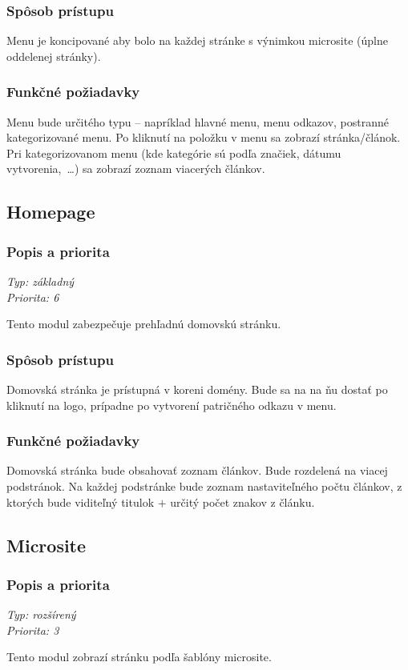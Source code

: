 \documentclass[a4paper,titlepage,11pt]{article}
\begin{document}
\subsubsection{Spôsob prístupu}
Menu je koncipované aby bolo na každej stránke s výnimkou microsite (úplne oddelenej stránky). 
\subsubsection{Funkčné požiadavky}
Menu bude určitého typu -- napríklad hlavné menu, menu odkazov, postranné kategorizované menu. 
Po kliknutí na položku v menu sa zobrazí stránka\slash článok. 
Pri kategorizovanom menu (kde kategórie sú podľa značiek, dátumu vytvorenia,~\ldots) sa zobrazí zoznam viacerých článkov. 

\subsection{Homepage}
\subsubsection{Popis a priorita}
\begin{flushleft}
 \emph{Typ: základný}\\
 \emph{Priorita: 6}\\
\end{flushleft}
Tento modul zabezpečuje prehľadnú domovskú stránku. 
\subsubsection{Spôsob prístupu}
Domovská stránka je prístupná v koreni domény. Bude sa na na ňu dostať po kliknutí na logo, prípadne po vytvorení patričného odkazu v menu.
\subsubsection{Funkčné požiadavky}
Domovská stránka bude obsahovať zoznam článkov. Bude rozdelená na viacej podstránok. 
Na každej podstránke bude zoznam nastaviteľného počtu článkov, z ktorých bude viditeľný titulok $+$ určitý počet znakov z článku.

\subsection{Microsite}
\subsubsection{Popis a priorita}
\begin{flushleft}
 \emph{Typ: rozšírený}\\
 \emph{Priorita: 3}\\
\end{flushleft}
Tento modul zobrazí stránku podľa šablóny microsite.
\end{document}
